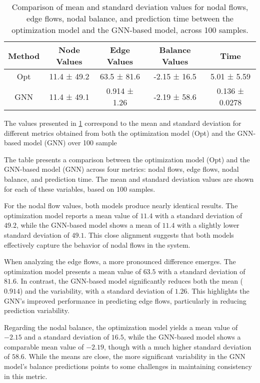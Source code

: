 \begin{table}[h]
\centering
\begin{tabular}{|c|c|c|c|c|}
\hline
Method & Node Values & Edge Values & Balance Values & Time \\ \hline
Opt & 11.4 ± 49.2 & 63.5 ± 81.6 & -2.15 ± 16.5 & 5.01 ± 5.59 \\ \hline
GNN & 11.4 ± 49.1 & 0.914 ± 1.26 & -2.19 ± 58.6 & 0.136 ± 0.0278 \\ \hline
\end{tabular}
\caption{Comparison of mean and standard deviation values for nodal flows, edge flows, nodal balance, and prediction time between the optimization model and the GNN-based model, across 100 samples.}
\label{tab:lineal_col_base_results}
\end{table}
The values presented in \cref{tab:lineal_col_base_results} correspond to the mean and standard deviation for different metrics obtained from both the optimization model (Opt) and the GNN-based model (GNN) over 100 sample 




The table presents a comparison between the optimization model (Opt) and the GNN-based model (GNN) across four metrics: nodal flows, edge flows, nodal balance, and prediction time. The mean and standard deviation values are shown for each of these variables, based on 100 samples.

For the nodal flow values, both models produce nearly identical results. The optimization model reports a mean value of $11.4$ with a standard deviation of $49.2$, while the GNN-based model shows a mean of $11.4$ with a slightly lower standard deviation of $49.1$. This close alignment suggests that both models effectively capture the behavior of nodal flows in the system.

When analyzing the edge flows, a more pronounced difference emerges. The optimization model presents a mean value of $63.5$ with a standard deviation of $81.6$. In contrast, the GNN-based model significantly reduces both the mean ($0.914$) and the variability, with a standard deviation of $1.26$. This highlights the GNN's improved performance in predicting edge flows, particularly in reducing prediction variability.

Regarding the nodal balance, the optimization model yields a mean value of $-2.15$ and a standard deviation of $16.5$, while the GNN-based model shows a comparable mean value of $-2.19$, though with a much higher standard deviation of $58.6$. While the means are close, the more significant variability in the GNN model's balance predictions points to some challenges in maintaining consistency in this metric.


